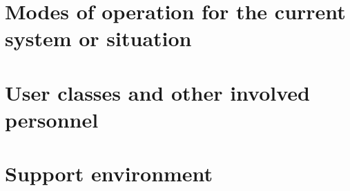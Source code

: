 \section{Modes of operation for the current system or situation \label{Section::Modes of Operation for the current system or situation}}


\section{User classes and other involved personnel \label{Section::User Classes and other involved personnel}}



\section{Support environment \label{Section::Support Environment}}




